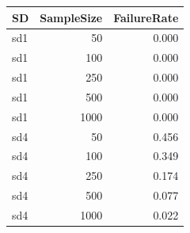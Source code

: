 
\begin{tabular}{lrr}
\toprule
SD & SampleSize & FailureRate\\
\midrule
sd1 & 50 & 0.000\\
sd1 & 100 & 0.000\\
sd1 & 250 & 0.000\\
sd1 & 500 & 0.000\\
sd1 & 1000 & 0.000\\
\addlinespace
sd4 & 50 & 0.456\\
sd4 & 100 & 0.349\\
sd4 & 250 & 0.174\\
sd4 & 500 & 0.077\\
sd4 & 1000 & 0.022\\
\bottomrule
\end{tabular}
